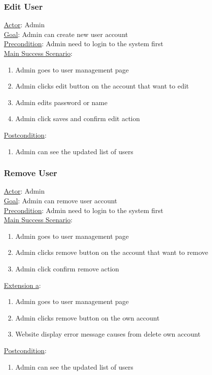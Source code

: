 \documentclass[12pt,oneside,openright,a4paper]{cpe-english-project}
\begin{document}
	\subsubsection{Edit User}
	\underline{Actor}: Admin\\
	\underline{Goal}: Admin can create new user account\\
	\underline{Precondition}: Admin need to login to the system first\\
	\underline{Main Success Scenario}:
	\begin{enumerate}[label={\arabic*.}]
		\item Admin goes to user management page
		\item Admin clicks edit button on the account that want to edit
		\item Admin edits password or name
		\item Admin click saves and confirm edit action
	\end{enumerate}
	\underline{Postcondition}: 
	\begin{enumerate}[label={\arabic*.}]
		\item Admin can see the updated list of users
	\end{enumerate}

	\subsubsection{Remove User}
	\underline{Actor}: Admin\\
	\underline{Goal}: Admin can remove user account\\
	\underline{Precondition}: Admin need to login to the system first\\
	\underline{Main Success Scenario}:
	\begin{enumerate}[label={\arabic*.}]
		\item Admin goes to user management page
		\item Admin clicks remove button on the account that want to remove
		\item Admin click confirm remove action
	\end{enumerate}
	\underline{Extension a}:
	\begin{enumerate}[label={\arabic*.}]
		\item Admin goes to user management page
		\item Admin clicks remove button on the own account
		\item Website display error message causes from delete own account
	\end{enumerate}
	\underline{Postcondition}: 
	\begin{enumerate}[label={\arabic*.}]
		\item Admin can see the updated list of users
	\end{enumerate}
\end{document}
